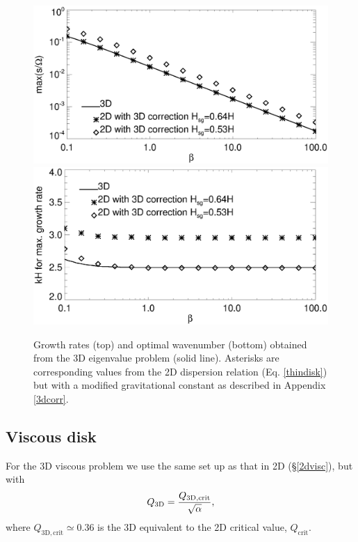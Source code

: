 \begin{figure}
  \includegraphics[width=\linewidth,clip=true,trim=0cm 1.5cm 0.23cm
    0.0cm]{figures/3d_inviscid_rates}\\
  \includegraphics[width=\linewidth,clip=true,trim=0cm 0cm 0.23cm
    0.88cm]{figures/3d_inviscid_kmax}
  \caption{Growth rates (top) and optimal wavenumber (bottom) obtained
    from the 3D eigenvalue problem (solid line). Asterisks are
    corresponding values from the 2D dispersion relation
    (Eq. \ref{thindisk}) but with a modified gravitational constant
    as described in Appendix \ref{3dcorr}. \label{3d_inviscid}}
\end{figure}

\subsection{Viscous disk} %
For the 3D viscous problem we use the same set up as that in 2D
(\S\ref{2dvisc}), but with 
\begin{align*}
  Q_\mathrm{3D} = \frac{Q_\mathrm{3D,crit}}{\sqrt{\alpha}}, 
\end{align*}
where $Q_\mathrm{3D,crit}\simeq0.36$ is the 3D equivalent to the 2D
critical value, $Q_\mathrm{crit}$. 

